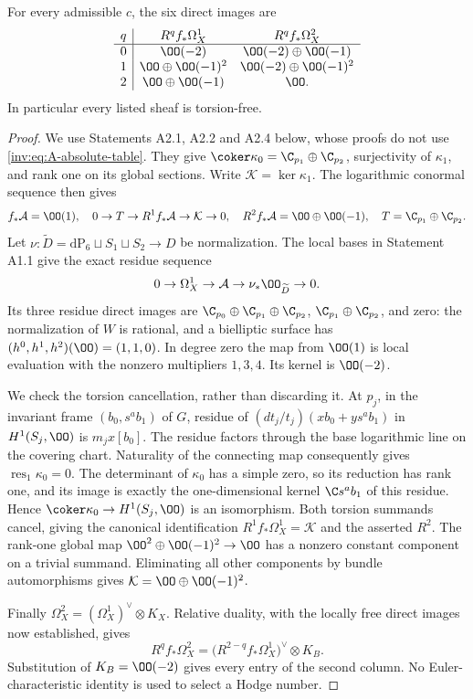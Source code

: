 \begin{proposition}\label{inv:A1.3}
For every admissible $c$, the six direct images are
\begin{equation}\label{inv:eq:A-absolute-table}
\begin{array}{c|cc}
q&R^qf_*\Omega_X^1&R^qf_*\Omega_X^2\\\hline
0&\OO(-2)&\OO(-2)\oplus\OO(-1)\\
1&\OO\oplus\OO(-1)^2&\OO(-2)\oplus\OO(-1)^2\\
2&\OO\oplus\OO(-1)&\OO.
\end{array}
\end{equation}
In particular every listed sheaf is torsion-free.
\end{proposition}
\begin{proof}
We use Statements A2.1, A2.2 and A2.4 below, whose proofs do not use
\eqref{inv:eq:A-absolute-table}.  They give
$\coker\kappa_0=\C_{p_1}\oplus\C_{p_2}$,
surjectivity of $\kappa_1$, and rank one on its global sections.
Write $\mathcal K=\ker\kappa_1$.  The logarithmic conormal sequence
then gives
\[
f_*\mathcal A=\OO(1),\quad
0\to T\to R^1f_*\mathcal A\to\mathcal K\to0,\quad
R^2f_*\mathcal A=\OO\oplus\OO(-1),
\quad T=\C_{p_1}\oplus\C_{p_2}.
\]
Let $\nu:\widetilde D=\mathrm{dP}_6\sqcup S_1\sqcup S_2\to D$
be normalization.  The local bases in Statement A1.1 give the exact
residue sequence
\[
0\to\Omega_X^1\to\mathcal A\to\nu_*\OO_{\widetilde D}\to0.
\]
Its three residue direct images are
$\C_{p_0}\oplus\C_{p_1}\oplus\C_{p_2}$,
$\C_{p_1}\oplus\C_{p_2}$, and zero: the normalization of $W$ is
rational, and a bielliptic surface has $(h^0,h^1,h^2)(\OO)=(1,1,0)$.
In degree zero the map from $\OO(1)$ is local evaluation with the
nonzero multipliers $1,3,4$.  Its kernel is $\OO(-2)$.

We check the torsion cancellation, rather than discarding it.  At
$p_j$, in the invariant frame $(b_0,s^ab_1)$ of $G$, residue of
$(dt_j/t_j)(x b_0+y s^ab_1)$ in $H^1(S_j,\OO)$ is $m_jx[b_0]$.
The residue factors through the base logarithmic line on the covering
chart.  Naturality of the connecting map consequently gives
$\operatorname{res}_1\kappa_0=0$.  The determinant of $\kappa_0$
has a simple zero, so its reduction has rank one, and its image is
exactly the one-dimensional kernel $\C s^ab_1$ of this residue.
Hence $\coker\kappa_0\to H^1(S_j,\OO)$ is an isomorphism.
Both torsion summands cancel, giving the canonical identification
$R^1f_*\Omega_X^1=\mathcal K$ and the asserted $R^2$.
The rank-one global map
$\OO^2\oplus\OO(-1)^2\to\OO$ has a nonzero constant component
on a trivial summand.  Eliminating all other components by bundle
automorphisms gives
$\mathcal K=\OO\oplus\OO(-1)^2$.

Finally $\Omega_X^2=(\Omega_X^1)^\vee\otimes K_X$.  Relative
duality, with the locally free direct images now established, gives
\[
R^qf_*\Omega_X^2
=\bigl(R^{2-q}f_*\Omega_X^1\bigr)^\vee\otimes K_B.
\]
Substitution of $K_B=\OO(-2)$ gives every entry of the second column.
No Euler-characteristic identity is used to select a Hodge number.
\end{proof}

